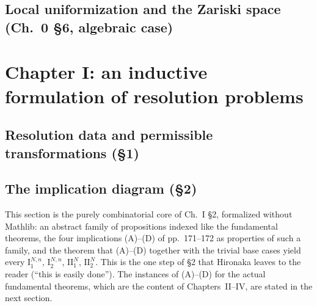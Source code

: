\section{Local uniformization and the Zariski space (Ch.~0 \S6, algebraic case)}

\chapter{Chapter I: an inductive formulation of resolution problems}

\section{Resolution data and permissible transformations (\S1)}

\section{The implication diagram (\S2)}

This section is the purely combinatorial core of Ch.~I \S2, formalized without Mathlib: an
abstract family of propositions indexed like the fundamental theorems, the four implications
(A)--(D) of pp.~171--172 as properties of such a family, and the theorem that (A)--(D)
together with the trivial base cases yield every $\mathrm I_1^{N,n}$, $\mathrm I_2^{N,n}$,
$\mathrm{II}_1^N$, $\mathrm{II}_2^N$.  This is the one step of \S2 that Hironaka leaves to the
reader (``this is easily done'').  The instances of (A)--(D) for the actual fundamental theorems, which are
the content of Chapters~II--IV, are stated in the next section.

